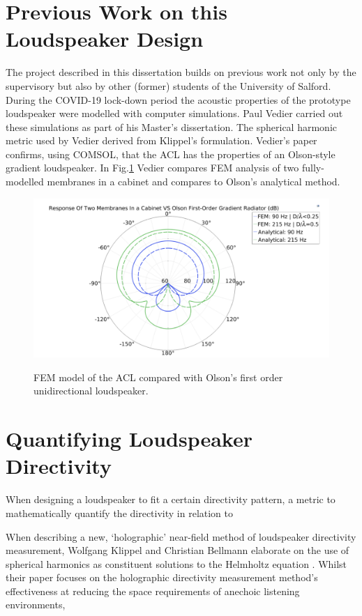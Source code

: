 \documentclass{report}
\begin{document}
    \section{Previous Work on this Loudspeaker Design}
        The project described in this dissertation builds on previous work not only by the supervisory but also by other (former) students of the University of Salford.
        During the COVID-19 lock-down period the acoustic properties of the prototype loudspeaker were modelled with computer simulations.
        Paul Vedier carried out these simulations as part of his Master's dissertation.
        The spherical harmonic metric used by Vedier derived from Klippel's formulation.
        Vedier's paper confirms, using COMSOL, that the ACL has the properties of an Olson-style gradient loudspeaker.
        In Fig.\ref{vedierPolar} Vedier compares FEM analysis of two fully-modelled membranes in a cabinet and compares to Olson's analytical method.
        \begin{figure}[H]
            \centering
            \includegraphics[scale=0.5]{figs/vedierPolar.png}
            \caption{FEM model of the ACL compared with Olson's first order unidirectional loudspeaker.}\cite{vedier}
            \label{vedierPolar}
        \end{figure}




    \section{Quantifying Loudspeaker Directivity}
        When designing a loudspeaker to fit a certain directivity pattern, a metric to mathematically quantify the directivity in relation to
        
        When describing a new, `holographic' near-field method of loudspeaker directivity measurement, Wolfgang Klippel and Christian Bellmann elaborate on the use of spherical harmonics as constituent solutions to the Helmholtz equation \cite{klippel2016}.
        Whilst their paper focuses on the holographic directivity measurement method's effectiveness at reducing the space requirements of anechoic listening environments, 
\end{document}
